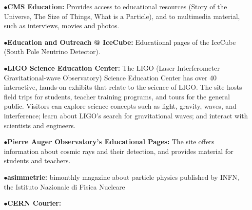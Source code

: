 \medskip

\item{$\bullet$}{\bf CMS Education:} 
Provides access to educational resources (Story of the 
Universe, The Size of Things, What is a Particle), and to multimedia 
material, such as interviews, movies and photos.
	\item{}

\medskip

\item{$\bullet$}{\bf Education and Outreach @ IceCube:}
Educational pages of the IceCube (South Pole Neutrino Detector).
    \item{}


\medskip

\item{$\bullet$}{\bf LIGO Science Education Center:}
The LIGO (Laser Interferometer 
Gravitational-wave Observatory) Science Education Center has over 
40 interactive, hands-on exhibits that relate to the science of LIGO. The 
site hosts field trips for students, teacher training programs, and tours 
for the general public. Visitors can explore science concepts such as 
light, gravity, waves, and interference; learn about LIGO's search for 
gravitational waves; and interact with scientists and engineers.
     \item{}


\medskip

\item{$\bullet$}{\bf Pierre Auger Observatory's Educational Pages:}
The site offers information about cosmic rays and their detection, and provides material for students and teachers.
     \item{}

\medskip
\medskip



\medskip


\item{$\bullet$}{\bf asimmetrie:}
bimonthly magazine about particle physics published by INFN, the Istituto Nazionale di Fisica Nucleare
	\item{}
\medskip

\item{$\bullet$}{\bf CERN Courier:}
	\item{}
\medskip

